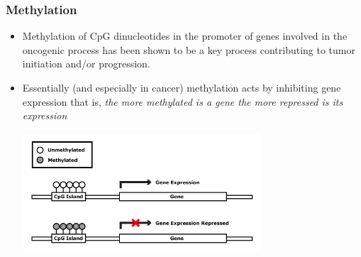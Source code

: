 \documentclass[handout]{beamer}
\begin{document}
\begin{frame}[fragile]\frametitle{Methylation}
\begin{itemize}
\item Methylation of CpG dinucleotides in the promoter of genes
  involved in the oncogenic process has been shown to be a key process
  contributing to tumor initiation and/or progression.
\item Essentially (and especially in cancer) methylation acts by inhibiting gene expression that
  is,\emph{ the more methylated is a gene the more repressed is its expression}
\begin{center}
\includegraphics[width=0.7\textwidth]{./images/methylationAction1.png}
\end{center}
\end{itemize}
\end{frame}
\end{document}
